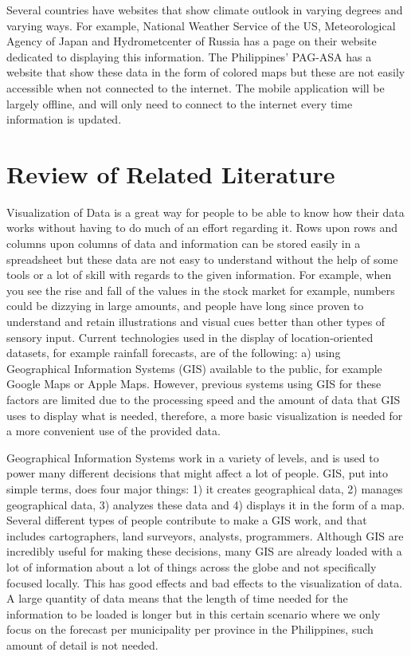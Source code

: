 \documentclass[letterpaper, 10 pt, conference]{ieeeconf}  %
\begin{document}
Several countries have websites that show climate outlook in varying degrees and varying ways. For example, National Weather Service of the US, Meteorological Agency of Japan and Hydrometcenter of Russia has a page on their website dedicated to displaying this information. The Philippines’ PAG-ASA has a website that show these data in the form of colored maps but these are not easily accessible when not connected to the internet. The mobile application will be largely offline, and will only need to connect to the internet every time information is updated.

\section{Review of Related Literature}

Visualization of Data is a great way for people to be able to know how their data works without having to do much of an effort regarding it. Rows upon rows and columns upon columns of data and information can be stored easily in a spreadsheet but these data are not easy to understand without the help of some tools or a lot of skill with regards to the given information. For example, when you see the rise and fall of the values in the stock market for example, numbers could be dizzying in large amounts, and people have long since proven to understand and retain illustrations and visual cues better than other types of sensory input. \cite{TurnerUX} Current technologies used in the display of location-oriented datasets, for example rainfall forecasts, are of the following: a) using Geographical Information Systems (GIS) available to the public, for example Google Maps or Apple Maps. However, previous systems using GIS for these factors are limited due to the processing speed and the amount of data that GIS uses to display what is needed, therefore, a more basic visualization is needed for a more convenient use of the provided data.\setlength{\parskip}{6pt}

Geographical Information Systems work in a variety of levels, and is used to power many different decisions that might affect a lot of people. GIS, put into simple terms, does four major things: 1)  it creates geographical data, 2) manages geographical data, 3) analyzes these data and 4) displays it in the form of a map. Several different types of people contribute to make a GIS work, and that includes cartographers, land surveyors, analysts, programmers. Although GIS are incredibly useful for making these decisions, many GIS are already loaded with a lot of information about a lot of things across the globe and not specifically focused locally.\cite{gis} This has good effects and bad effects to the visualization of data. A large quantity of data means that the length of time needed for the information to be loaded is longer but in this certain scenario where we only focus on the forecast per municipality per province in the Philippines, such amount of detail is not needed. \setlength{\parskip}{6pt}
\end{document}
